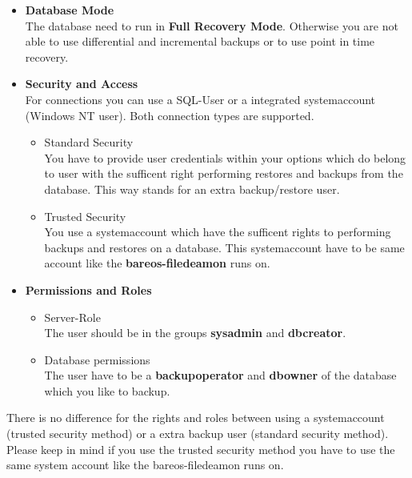 \begin{itemize}

\item {\bf Database Mode}\\
The database need to run in {\bf Full Recovery Mode}. Otherwise you are not able to use differential and incremental backups or to use point in time recovery.\\

\item {\bf Security and Access}\\
For connections you can use a SQL-User or a integrated systemaccount (Windows NT user). Both connection types are supported.
	\begin{itemize}
        \item Standard Security \\
You have to provide user credentials within your options which do belong to user with the sufficent right performing restores and backups from the database. This way stands for an extra backup/restore user.
	\item Trusted Security \\
	You use a systemaccount which have the sufficent rights to performing backups and restores on a database. This systemaccount have to be same account like the {\bf bareos-filedeamon} runs on.
	\end{itemize}
\item{\bf Permissions and Roles}
	\begin{itemize}
	\item Server-Role\\
	The user should be in the groups {\bf sysadmin} and {\bf dbcreator}.
	\item Database permissions\\
	The user have to be a {\bf backupoperator} and {\bf dbowner} of the database which you like to backup.
	\end{itemize}
\end{itemize}
There is no difference for the rights and roles between using a systemaccount (trusted security method) or a extra backup user (standard security method).
Please keep in mind if you use the trusted security method you have to use the same system account like the bareos-filedeamon runs on.

